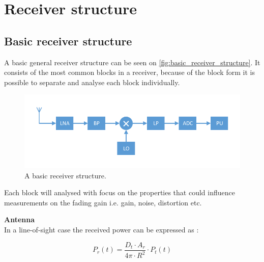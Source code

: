 \chapter{Receiver structure}

\section{Basic receiver structure}
\label{basic_rev_struct}
A basic general receiver structure can be seen on \autoref{fig:basic_receiver_structure}. It consists of the most common blocks in a receiver, because of the block form it is possible to separate and analyse each block individually. 

\begin{figure}[H]
\centering
\includegraphics[width= \textwidth]{figures/Receiver.pdf}
\caption{A basic receiver structure.}
\label{fig:basic_receiver_structure}
\end{figure}

Each block will analysed with focus on the properties that could influence measurements on the fading gain i.e. gain, noise, distortion etc.

\textbf{Antenna}\\
In a line-of-sight case the received power can be expressed as \citep[p. 86]{balanis}:

\begin{equation}
P_r(t) = \frac{D_t\cdot A_r}{4\pi\cdot R^2}\cdot P_t(t)
\end{equation} 
\begin{where}
\end{where}


